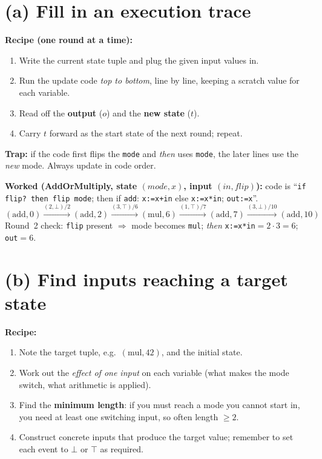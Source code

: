\section{(a) Fill in an execution trace}

\textbf{Recipe (one round at a time):}
\begin{enumerate}
  \item Write the current state tuple and plug the given input values in.
  \item Run the update code \emph{top to bottom}, line by line, keeping a scratch
        value for each variable.
  \item Read off the \textbf{output} ($o$) and the \textbf{new state} ($t$).
  \item Carry $t$ forward as the start state of the next round; repeat.
\end{enumerate}
\begin{keybox}
\textbf{Trap:} if the code first flips the \texttt{mode} and \emph{then} uses
\texttt{mode}, the later lines use the \emph{new} mode. Always update in code order.
\end{keybox}

\textbf{Worked (AddOrMultiply, state $(\mathit{mode},x)$, input $(\mathit{in},\mathit{flip})$):}
code is ``\texttt{if flip? then flip mode}; then if \texttt{add}: \texttt{x:=x+in}
else \texttt{x:=x*in}; \texttt{out:=x}''.
\[
(\mathrm{add},0)
\xrightarrow{(2,\bot)/2}(\mathrm{add},2)
\xrightarrow{(3,\top)/6}(\mathrm{mul},6)
\xrightarrow{(1,\top)/7}(\mathrm{add},7)
\xrightarrow{(3,\bot)/10}(\mathrm{add},10)
\]
Round~2 check: \texttt{flip} present $\Rightarrow$ mode becomes \texttt{mul};
\emph{then} \texttt{x:=x*in}$=2\cdot3=6$; \texttt{out}$=6$.

\section{(b) Find inputs reaching a target state}

\textbf{Recipe:}
\begin{enumerate}
  \item Note the target tuple, e.g.\ $(\mathrm{mul},42)$, and the initial state.
  \item Work out the \emph{effect of one input} on each variable (what makes the
        mode switch, what arithmetic is applied).
  \item Find the \textbf{minimum length}: if you must reach a mode you cannot start
        in, you need at least one switching input, so often length $\ge 2$.
  \item Construct concrete inputs that produce the target value; remember to set
        each event to $\bot$ or $\top$ as required.
\end{enumerate}

